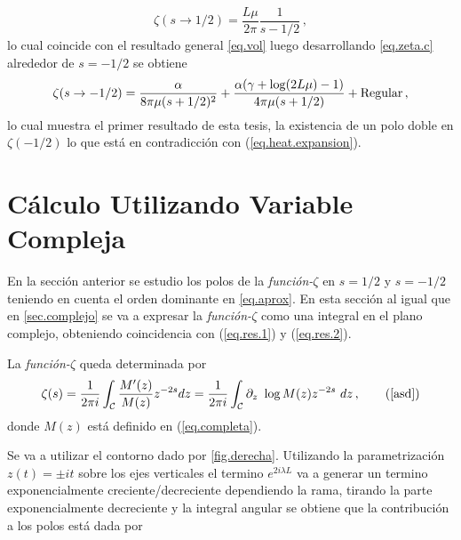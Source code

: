 \begin{equation}\label{eq.res.2}
    \zeta  (s \rightarrow 1/2) = \frac{L \mu }{2 \pi} \frac{1}{s-1/2}    
    	\, ,
\end{equation}
lo cual coincide con el resultado general \ref{eq.vol} luego desarrollando \ref{eq.zeta.c} alrededor de $s=-1/2$ se obtiene
\begin{equation}\label{eq.res.1}
    \zeta  (s \rightarrow -1/2 ) =  \frac{\alpha}{8  \pi \mu (s+1/2)^2} +
    \frac{ \alpha ( \gamma  +  \log (2L \mu ) -1 ) }{4  \pi \mu (s+1/2) }  + 
    {\rm Regular}
    	\, ,
\end{equation}
lo cual muestra el primer resultado de esta tesis, la existencia de un polo doble en $\zeta(-1/2)$ lo que está en contradicción con (\ref{eq.heat.expansion}).

\section{Cálculo Utilizando Variable Compleja}\label{seq.2.com}


En la sección anterior se estudio los polos de la {\it función-$\zeta$} en $s=1/2$ y $s=-1/2$ teniendo en cuenta el orden dominante en \ref{eq.aprox}.
En esta sección al igual que en \ref{sec.complejo} se va a expresar la {\it función-$\zeta $} como una integral en el plano complejo, obteniendo coincidencia con (\ref{eq.res.1}) y (\ref{eq.res.2}).

La {\it función-$ \zeta$} queda determinada por
\begin{equation}
\zeta (s) = 
\frac{1}{2 \pi i} 
\int _{\mathcal{C}}
\frac{M ' ( z ) }{ M ( z ) } z ^{-2s} d z = 
\frac{1}{2 \pi i} 
\int _{\mathcal{C}}
\partial _z \ \log 	M(z)  z ^{-2s} \ dz
	\, ,
	\tag{\ref{asd}}
\end{equation}
donde $M (z)$ está definido en (\ref{eq.completa}).

Se va a utilizar el contorno dado por \ref{fig.derecha}. 
Utilizando la parametrización $ z (t) = \pm i t$ sobre los ejes verticales el termino $e ^{2 i \lambda L}$ va a generar un termino exponencialmente creciente/decreciente dependiendo la rama, tirando la parte exponencialmente decreciente y la integral angular se obtiene que la contribución a los polos está dada por 
\begin{comment}
\begin{equation}
\begin{array}{c}
    \zeta  (s) = \\
     \frac{1}{2 \pi i} \int _{\infty} ^{1}
     \frac{ i \alpha }{2 t^2} 
     \left(
      1 + \frac{i \pi}{2} + Ln[2 t] + \psi (1 + \frac{\beta}{2 t})
     \right)
     t ^{-2s}
     e ^{- i \pi s} (i dt) + \\
     \frac{1}{2 \pi i} \int _{\infty} ^{1} 
     \left(
     2 + \frac{\beta}{2 t^2}
     \left(
     1 + \frac{i \pi}{2} - Ln[2 t] - \psi (1+ \frac{\beta}{2 t})
     \right)
     t ^{-2s}
     e ^{ i \pi s} (-i dt)
     \right)     
\end{array}
\end{equation}
\end{comment}

